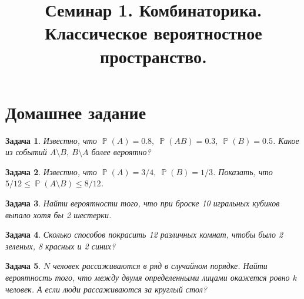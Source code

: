 \documentclass[11pt]{article}
\title{Семинар 1. Комбинаторика. Классическое вероятностное пространство.}
\date{\vspace{-1cm}}
\DeclareMathOperator\PP{\mathbb{P}}
\newtheorem{problem}{Задача}
\begin{document}
\maketitle

\section*{Домашнее задание}
\begin{problem}
    Известно, что $\PP(A) = 0.8,\ \PP(AB) = 0.3,\ \PP(B) = 0.5$.
    Какое из событий $A \setminus B,\ B \setminus A$ более вероятно?
\end{problem}

\begin{problem}
    Известно, что $\PP(A) = 3 / 4,\ \PP(B) = 1 / 3$.
    Показать, что $5 / 12 \leq \PP(A \setminus B) \leq 8 / 12$.
\end{problem}

\begin{problem}
    Найти вероятности того, что при броске 10 игральных кубиков выпало хотя бы 2 шестерки.
\end{problem}

\begin{problem}
    Сколько способов покрасить 12 различных комнат, чтобы было 2 зеленых, 8 красных и 2 синих?
\end{problem}

\begin{problem}
    $N$ человек рассаживаются в ряд в случайном порядке.
    Найти вероятность того, что между двумя определенными лицами окажется ровно $k$ человек.
    А если люди рассаживаются за круглый стол?
\end{problem}

% 
\end{document}
